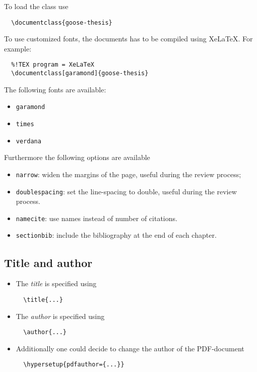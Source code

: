To load the class use
\begin{verbatim}
  \documentclass{goose-thesis}
\end{verbatim}
%
To use customized fonts, the documents has to be compiled using XeLaTeX. For example:
\begin{verbatim}
  %!TEX program = XeLaTeX
  \documentclass[garamond]{goose-thesis}
\end{verbatim}
%
The following fonts are available:
%
\begin{itemize}
  \item \texttt{garamond}
  \item \texttt{times}
  \item \texttt{verdana}
\end{itemize}
%
%
Furthermore the following options are available
%
\begin{itemize}
  \item \texttt{narrow}: widen the margins of the page, useful during the review process;
  \item \texttt{doublespacing}: set the line-spacing to double, useful during the review process.
  \item \texttt{namecite}: use names instead of number of citations.
  \item \texttt{sectionbib}: include the bibliography at the end of each chapter.
\end{itemize}
%

\subsection{Title and author}

%
\begin{itemize}
%
\item The \textit{title} is specified using
\begin{verbatim}
  \title{...}
\end{verbatim}
%
\item The \textit{author} is specified using
\begin{verbatim}
  \author{...}
\end{verbatim}
%
\item Additionally one could decide to change the author of the PDF-document
\begin{verbatim}
  \hypersetup{pdfauthor={...}}
\end{verbatim}
%
\end{itemize}
%

